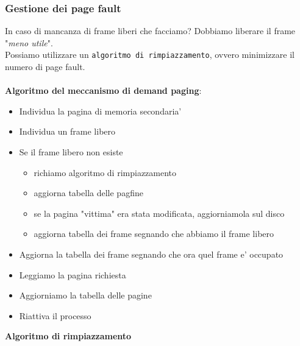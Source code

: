 \documentclass[a4paper,12pt]{article}
\begin{document}
\subsubsection*{Gestione dei page fault}\label{page_fault}
In caso di mancanza di frame liberi che facciamo? Dobbiamo liberare il frame "\textit{meno utile}".\\
Possiamo utilizzare un \texttt{algoritmo di rimpiazzamento}, ovvero minimizzare il numero di page fault.  \\
\vspace{1px}\\
\textbf{Algoritmo del meccanismo di demand paging}:
  \begin{itemize}
    \item Individua la pagina di memoria secondaria'
    \item Individua un frame libero
    \item Se il frame libero non esiste
    \begin{itemize}
      \item richiamo algoritmo di rimpiazzamento
      \item aggiorna tabella delle pagfine
      \item se la pagina "vittima" era stata modificata, aggiorniamola sul disco
      \item aggiorna tabella dei frame segnando che abbiamo il frame libero
    \end{itemize}
    \item Aggiorna la tabella dei frame segnando che ora quel frame e' occupato
    \item Leggiamo la pagina richiesta
    \item Aggiorniamo la tabella delle pagine
    \item Riattiva il processo
\end{itemize}
\textbf{Algoritmo di rimpiazzamento}
\end{document}
